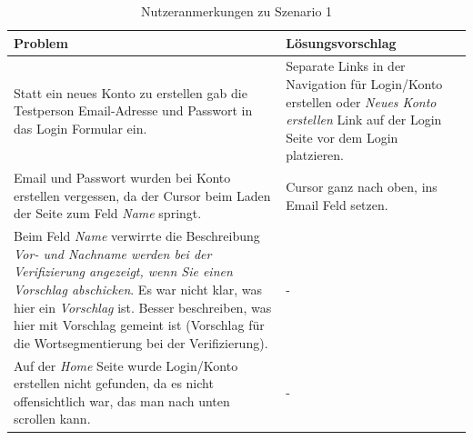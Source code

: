 \begin{table}[h!]
	\centering
	\begin{tabular}{|p{}|p{}|}
		\hline
		\textbf{Problem} & \textbf{Lösungsvorschlag}\\
		\hline
		\hline
		Statt ein neues Konto zu erstellen gab die Testperson Email-Adresse und Passwort in das Login Formular ein. & Separate Links in der Navigation für Login/Konto erstellen oder \textit{Neues Konto erstellen} Link auf der Login Seite vor dem Login platzieren.\\
		\hline
		Email und Passwort wurden bei Konto erstellen vergessen, da der Cursor beim Laden der Seite zum Feld \textit{Name} springt. & Cursor ganz nach oben, ins Email Feld setzen.\\
		\hline
		Beim Feld \textit{Name} verwirrte die Beschreibung \textit{Vor- und Nachname werden bei der Verifizierung angezeigt, wenn Sie einen Vorschlag abschicken}. Es war nicht klar, was hier ein \textit{Vorschlag} ist.
		Besser beschreiben, was hier mit Vorschlag gemeint ist (Vorschlag für die Wortsegmentierung bei der Verifizierung). & -\\
		\hline
		Auf der \textit{Home} Seite wurde Login/Konto erstellen nicht gefunden, da es nicht offensichtlich war, das man nach unten scrollen kann. & -\\
		\hline
	\end{tabular}
	\caption{Nutzeranmerkungen zu Szenario 1}
	\label{table:szenario1}
\end{table}
\newpage

